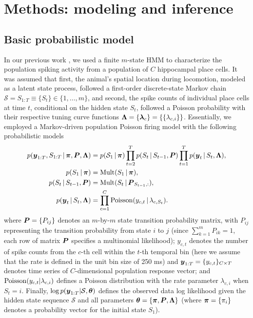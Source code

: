 \section{Methods: modeling and inference}

\subsection{Basic probabilistic model} 


In our previous work  \citep{Chen12a}, we  used a finite $m$-state HMM to characterize the population spiking activity from a population of $C$ hippocampal place cells. 
It was assumed that first, the animal's spatial location during locomotion, modeled as a latent state process, followed a first-order discrete-state Markov chain $\mathcal{S}=S_{1:T}\equiv \{S_t\}\in\{1,\dots, m\}$, and second, the spike counts of individual place cells at time $t$, conditional on the hidden state $S_t$, followed a Poisson  probability with their respective tuning curve functions ${\boldsymbol{\Lambda}=\{\boldsymbol{\lambda}_c\}=\{\{\lambda_{c,i}\}\}}$. Essentially, we employed a Markov-driven population Poisson firing model with the following probabilistic models 
\begin{align}
p(\boldsymbol{y}_{1:T}, S_{1:T} \,|\, \boldsymbol{\pi}, \boldsymbol{P}, \boldsymbol{\Lambda}) &= p(\mathcal{S}_1\,|\, \boldsymbol{\pi}) \prod_{t=2}^T p(S_t \,|\, S_{t-1}, \boldsymbol{P}) \prod_{t=1}^T p(\boldsymbol{y}_t \,|\, S_t, \boldsymbol{\Lambda}),\\
\nonumber p(S_1 \,|\, \boldsymbol{\pi}) &= \mathrm{Mult}(S_1 \,|\, \boldsymbol{\pi}), \\
\nonumber p(S_t \,|\, S_{t-1}, \boldsymbol{P}) &= \mathrm{Mult}(S_t \,|\, \boldsymbol{P}_{S_{t-1},:}), \\
\nonumber p(\boldsymbol{y}_t \,|\, S_t, \boldsymbol{\Lambda}) &= \prod_{c=1}^C \mathrm{Poisson}(y_{c,t} \,|\, \lambda_{c,S_t}).
\end{align}
where  $\boldsymbol{P}=\{P_{ij}\}$ denotes an $m$-by-$m$ state transition probability matrix, with $P_{ij}$ representing the transition probability from state $i$ to $j$ (since $\sum_{k=1}^m P_{ik}=1$, each row of matrix $\boldsymbol{P}$ specifies a multinomial likelihood); $y_{c,t}$ denotes the number of spike counts from the $c$-th cell within the $t$-th temporal bin (here we assume that the rate is defined in the unit bin size of 250 ms) and ${\boldsymbol{y}}_{1:T}=\{y_{c,t}\}_{C\times T}$ denotes time series of $C$-dimensional  population response vector; and $\mathrm{Poisson}(y_{c,t}|\lambda_{c,i})$ defines a Poisson distribution with the rate parameter $\lambda_{c,i}$ when $S_t=i$. Finally,  $\log p({\boldsymbol{y}}_{1:T}|\mathcal{S},\boldsymbol{\theta})$ defines the observed data log likelihood given the hidden state sequence $\mathcal{S}$ and all parameters $\boldsymbol{\theta}=\{\boldsymbol{\pi}, \boldsymbol{P}, \boldsymbol{\Lambda}\}$ (where $\boldsymbol{\pi}=\{\pi_i\}$ denotes a probability vector for the initial state $S_1$).   


